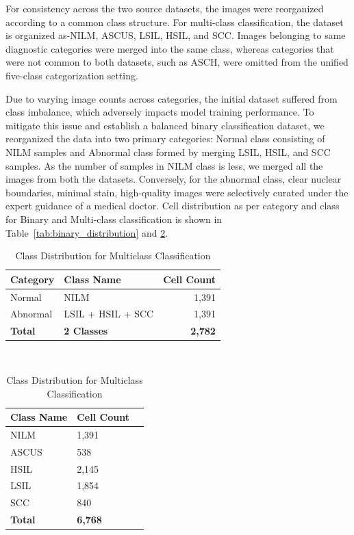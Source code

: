 \documentclass[pdflatex,sn-nature]{sn-jnl}%
\theoremstyle{thmstyleone}%
\theoremstyle{thmstyletwo}%
\theoremstyle{thmstylethree}%
\begin{document}
For consistency across the two source datasets, the images were reorganized according to a common class structure. For multi-class classification, the dataset is organized as-NILM, ASCUS, LSIL, HSIL, and SCC. Images belonging to same diagnostic categories were merged into the same class, whereas categories that were not common to both datasets, such as ASCH, were omitted from the unified five-class categorization setting.

Due to varying image counts across categories, the initial dataset suffered from class imbalance, which adversely impacts model training performance. To mitigate this issue and establish a balanced binary classification dataset, we reorganized the data into two primary categories: Normal class consisting of NILM samples and Abnormal class formed by merging LSIL, HSIL, and SCC samples. As the number of samples in NILM class is less, we merged all the images from both the datasets. Conversely, for the abnormal class, clear nuclear boundaries, minimal stain, high-quality images were selectively curated under the expert guidance of a medical doctor. Cell distribution as per category and class for Binary and Multi-class classification is shown in Table~\ref{tab:binary_distribution} and \ref{tab:multiclass_distribution}.

\begin{table}[htbp]
\centering

\begin{minipage}[t]{\textwidth}
\centering
\caption{Class Distribution for Binary Classification}
\label{tab:binary_distribution}
\begin{tabular}{llr}
\toprule
\textbf{Category} & \textbf{Class Name} & \textbf{Cell Count} \\
\midrule
Normal   & NILM & 1,391 \\
Abnormal & LSIL + HSIL + SCC & 1,391 \\
\midrule
\textbf{Total} & \textbf{2 Classes} & \textbf{2,782} \\
\bottomrule
\end{tabular}
\end{minipage} \\

\begin{minipage}[t]{\textwidth}
\centering
\caption{Class Distribution for Multiclass Classification}
\label{tab:multiclass_distribution}
\begin{tabular}{llr}
\toprule
\textbf{Class Name} & \textbf{Cell Count} \\
\midrule
NILM  & 1,391 \\
ASCUS & 538 \\
HSIL  & 2,145 \\
LSIL  & 1,854 \\
SCC   & 840 \\
\midrule
\textbf{Total} & \textbf{6,768} \\
\bottomrule
\end{tabular}
\end{minipage}
\hfill 

\end{table}
\end{document}

